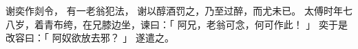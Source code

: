 
\switchcolumn*[\section{}]

谢奕作剡令，
有一老翁犯法，
谢以醇酒罚之，乃至过醉，而尤未已。
太傅时年七八岁，着青布绔，在兄膝边坐，谏曰：「
    阿兄，老翁可念，何可作此！
」
奕于是改容曰：「
    阿奴欲放去邪？
」
遂遣之。

\switchcolumn




